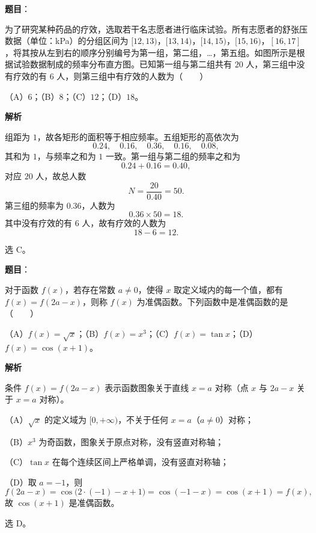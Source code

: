 \begin{answer}

\textbf{题目}：

为了研究某种药品的疗效，选取若干名志愿者进行临床试验。所有志愿者的舒张压数据（单位：kPa）的分组区间为 $[12,13)$，$[13,14)$，$[14,15)$，$[15,16)$，$[16,17]$，将其按从左到右的顺序分别编号为第一组，第二组，…，第五组。如图所示是根据试验数据制成的频率分布直方图。已知第一组与第二组共有 $20$ 人，第三组中没有疗效的有 $6$ 人，则第三组中有疗效的人数为\mbox{（　　）}

（A）$6$；（B）$8$；（C）$12$；（D）$18$。
\nopagebreak[4]
\begin{center}\end{center}
\nopagebreak[4]
\textbf{解析}

组距为 $1$，故各矩形的面积等于相应频率。五组矩形的高依次为
\nopagebreak[4]
\[0.24,\quad0.16,\quad0.36,\quad0.16,\quad0.08,\]
其和为 $1$，与频率之和为 $1$ 一致。第一组与第二组的频率之和为
\nopagebreak[4]
\[0.24+0.16=0.40,\]
对应 $20$ 人，故总人数
\nopagebreak[4]
\[N=\frac{20}{0.40}=50 .\]
第三组的频率为 $0.36$，人数为
\nopagebreak[4]
\[0.36\times50=18 .\]
其中没有疗效的有 $6$ 人，故有疗效的人数为
\nopagebreak[4]
\[18-6=12 .\]

选 C。


\end{answer}
\begin{answer}

\textbf{题目}：

对于函数 $f(x)$，若存在常数 $a\neq0$，使得 $x$ 取定义域内的每一个值，都有 $f(x)=f(2a-x)$，则称 $f(x)$ 为准偶函数。下列函数中是准偶函数的是\mbox{（　　）}

（A）$f(x)=\sqrt x$；（B）$f(x)=x^3$；（C）$f(x)=\tan x$；（D）$f(x)=\cos(x+1)$。

\textbf{解析}

条件 $f(x)=f(2a-x)$ 表示函数图象关于直线 $x=a$ 对称（点 $x$ 与 $2a-x$ 关于 $x=a$ 对称）。

（A）$\sqrt x$ 的定义域为 $[0,+\infty)$，不关于任何 $x=a$（$a\neq0$）对称；

（B）$x^3$ 为奇函数，图象关于原点对称，没有竖直对称轴；

（C）$\tan x$ 在每个连续区间上严格单调，没有竖直对称轴；

（D）取 $a=-1$，则
\nopagebreak[4]
\[f(2a-x)=\cos\bigl(2\cdot(-1)-x+1\bigr)=\cos(-1-x)=\cos(x+1)=f(x),\]
故 $\cos(x+1)$ 是准偶函数。

选 D。


\end{answer}
